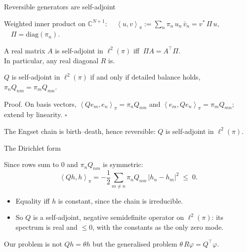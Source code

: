 \documentclass[aspectratio=169]{beamer}
\newcommand{\brackets}[2]{\left\langle#1,#2\right\rangle}
\renewcommand{\phi}{\varphi}
\newenvironment*{myitem}[1][1.5em]{\begin{itemize}\setlength{\itemsep}{#1}}{\end{itemize}}
\begin{document}
\begin{frame}{Reversible generators are self-adjoint}

	Weighted inner product on $\mathbb C^{N+1}$: $\quad \brackets{u}{v}_\pi := \sum_n \pi_n\, u_n\, \bar v_n = v^*\,\Pi\,u$, $\quad \Pi=\mathrm{diag}(\pi_n)$.

	\medskip

	A real matrix $A$ is self-adjoint in $\ell^2(\pi)$ iff $\ \Pi A = A^\top\Pi$.\\
	In particular, any real diagonal $R$ is.

	\medskip
	\begin{theorem}
		$Q$ is self-adjoint in $\ell^2(\pi)$ if and only if detailed balance holds, $\pi_n Q_{nm} = \pi_m Q_{mn}$.
	\end{theorem}

	\medskip

	\alert{Proof.} On basis vectors, $\brackets{Qe_m}{e_n}_\pi = \pi_n Q_{nm}$ and $\brackets{e_m}{Qe_n}_\pi = \pi_m Q_{mn}$; extend by linearity. \hfill $\square$

	\medskip
	{\footnotesize The Engset chain is birth--death, hence reversible: $Q$ is self-adjoint in $\ell^2(\pi)$.}
\end{frame}

\begin{frame}{The Dirichlet form}

	Since rows sum to $0$ and $\pi_nQ_{nm}$ is symmetric:
	\begin{equation*}
		\brackets{Qh}{h}_\pi = -\frac12\sum_{m\neq n}\pi_n Q_{nm}\,|h_n-h_m|^2 \;\leq\; 0 .
	\end{equation*}

	\medskip

	\begin{myitem}
		\item Equality iff $h$ is \alert{constant}, since the chain is irreducible.
		\pause
		\item So $Q$ is a \alert{self-adjoint, negative semidefinite} operator on $\ell^2(\pi)$: its spectrum is real and $\leq 0$, with the constants as the only zero mode.
	\end{myitem}

	\medskip
	\pause
	\begin{block}{}
		\begin{center}
		Our problem is not $Qh=\theta h$ but the \alert{generalised} problem $\theta\,R\phi = Q^\top\phi$.
		\end{center}
	\end{block}
	
\end{frame}
\end{document}
